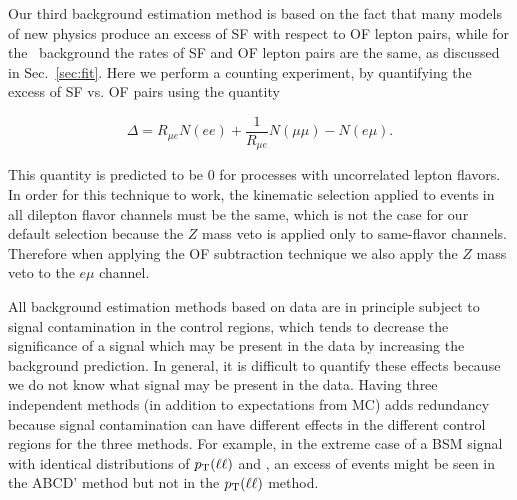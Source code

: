 Our third background estimation method is based on the fact that many models of new physics
produce an excess of SF with respect to OF lepton pairs, while for the \ttbar\ background the
rates of SF and OF lepton pairs are the same, as discussed in Sec.~\ref{sec:fit}. 
Here we perform a counting experiment, by quantifying the excess of SF vs. OF pairs using the
quantity

\begin{equation}
\label{eq:ofhighpt}
\Delta = R_{\mu e}N(ee) + \frac{1}{R_{\mu e}}N(\mu\mu) - N(e\mu).
\end{equation}

This quantity is predicted to be 0 for processes with 
uncorrelated lepton flavors. In order for this technique to work, the kinematic selection 
applied to events in all dilepton flavor channels must be the same, which is not the case 
for our default selection because the $Z$ mass veto is applied only to same-flavor channels.
Therefore when applying the OF subtraction technique we also apply the $Z$ mass veto
to the $e\mu$ channel. 

All background estimation methods based on data are in principle subject to signal contamination
in the control regions, which tends to decrease the significance of a signal
which may be present in the data by increasing the background prediction.
In general, it is difficult to quantify these effects because we 
do not know what signal may be present in the data.  Having three
independent methods (in addition to expectations from MC)
adds redundancy because signal contamination can have different effects
in the different control regions for the three methods.
For example, in the extreme case of a
BSM signal with identical distributions of $p_{\mathrm{T}}(\ell \ell)$ and \MET, an excess of events might be seen 
in the ABCD' method but not in the $p_{\mathrm{T}}(\ell \ell)$ method.

